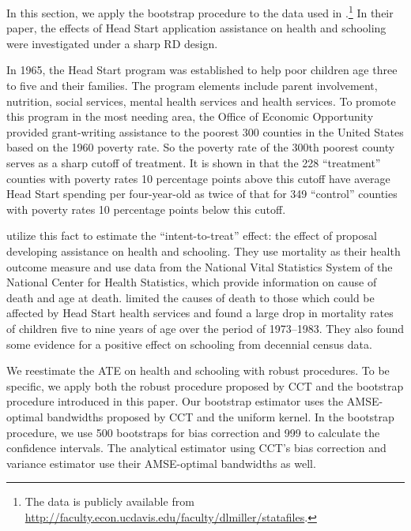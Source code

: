 \documentclass[12pt,fleqn]{article}
\begin{document}
In this section, we apply the bootstrap procedure to the data used in
\cite{ludwig2007}.\footnote{%
  The data is publicly available from
  \url{http://faculty.econ.ucdavis.edu/faculty/dlmiller/statafiles}.} %
In their paper, the effects of Head Start application assistance on health and
schooling were investigated under a sharp RD design.

In 1965, the Head Start program was established to help poor children age three
to five and their families. The program elements include parent involvement,
nutrition, social services, mental health services and health services. To
promote this program in the most needing area, the Office of Economic
Opportunity provided grant-writing assistance to the poorest 300 counties in the
United States based on the 1960 poverty rate. So the poverty rate of the 300th
poorest county serves as a sharp cutoff of treatment. It is shown in
\cite{ludwig2007} that the 228 ``treatment'' counties with poverty rates 10
percentage points above this cutoff have average Head Start spending per
four-year-old as twice of that for 349 ``control'' counties with poverty rates
10 percentage points below this cutoff.

\cite{ludwig2007} utilize this fact to estimate the ``intent-to-treat'' effect:
the effect of proposal developing assistance on health and schooling. They use
mortality as their health outcome measure and use data from the National Vital
Statistics System of the National Center for Health Statistics, which provide
information on cause of death and age at death. \cite{ludwig2007} limited the
causes of death to those which could be affected by Head Start health services
and found a large drop in mortality rates of children five to nine years of age
over the period of 1973--1983. They also found some evidence for a positive
effect on schooling from decennial census data.

We reestimate the ATE on health and schooling with robust procedures. To be
specific, we apply both the robust procedure proposed by CCT and the bootstrap
procedure introduced in this paper.  Our bootstrap estimator uses the
AMSE-optimal bandwidths proposed by CCT and the uniform kernel. In the bootstrap
procedure, we use 500 bootstraps for bias correction and 999 to calculate the
confidence intervals. The analytical estimator using CCT's bias correction and variance estimator use
their AMSE-optimal bandwidths as well.
\end{document}
